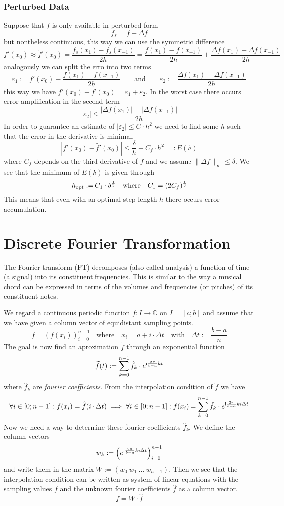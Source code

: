 \subsubsection{Perturbed Data}
Suppose that \(f\) is only available in perturbed form
\[f_s = f + \Delta f\]
but nontheless continuous, this way we can use the symmetric difference
\[f'(x_0) \approx \widetilde{f'}(x_0) = \frac{f_s(x_1) - f_s(x_{-1})}{2h} = \frac{f(x_1) - f(x_{-1})}{2h} + \frac{\Delta f(x_1) - \Delta f(x_{-1})}{2h}\]
analogously we can split the erro into two terms
\[\varepsilon_1 := f'(x_0) - \frac{f(x_1) - f(x_{-1})}{2h} \qquad\text{and}\qquad \varepsilon_2 := \frac{\Delta f(x_1) - \Delta f(x_{-1})}{2h}\]
this way we have \(f'(x_0) - \widetilde{f'}(x_0) = \varepsilon_1 + \varepsilon_2\).
In the worst case there occurs error amplification in the second term
\[|\varepsilon_2| \leq \frac{|\Delta f(x_1)| + |\Delta f(x_{-1})|}{2h}\]
In order to guarantee an estimate of \(|\varepsilon_2| \leq C \cdot h^2\) we need to find some \(h\) such that the error in the derivative is minimal.
\[|f'(x_0) - \widetilde{f'}(x_0) | \leq \frac{\delta}{h} + C_f \cdot h^2 =: E(h)\]
where \(C_f\) depends on the third derivative of \(f\) and we assume \(\|\Delta f\|_\infty \leq \delta\).
We see that the minimum of \(E(h)\) is given through
\[h_{\operatorname{opt}} := C_1 \cdot \delta^\frac{1}{3} \quad\text{where}\quad C_1 = (2 C_f)^\frac{1}{3}\]
This means that even with an optimal step-length \(h\) there occurs error accumulation.

\section{Discrete Fourier Transformation}
The Fourier transform (FT) decomposes (also called analysis) a function of time (a signal) into its constituent frequencies.
This is similar to the way a musical chord can be expressed in terms of the volumes and frequencies (or pitches) of its constituent notes.

 We regard a continuous periodic function \(f: I \to \mathbb{C}\) on \(I = [a; b]\) and assume that we have given a column vector of equidistant sampling points.
\[f = (f(x_i))_{i=0}^{n-1} \quad\text{where}\quad x_i = a + i \cdot \Delta t \quad\text{with}\quad \Delta t := \frac{b-a}{n}\]
The goal is now find an aproximation \(\widetilde{f}\) through an exponential function
 \[\widetilde{f}(t) := \sum_{k=0}^{n-1} \hat{f}_k \cdot e^{\mathrm{i} \frac{2\pi}{b-a} k t}\]
where \(\hat{f}_k\) are \emph{fourier coefficients}.
From the interpolation condition of \(\widetilde{f}\) we have
\[\forall i \in [0; n-1]: f(x_i) = \widetilde{f}(i \cdot \Delta t) \implies \forall i \in [0; n-1]: f(x_i) = \sum_{k=0}^{n-1} \hat{f}_k \cdot e^{\mathrm{i} \frac{2\pi}{b-a} k i \Delta t}\]
Now we need a way to determine these fourier coefficients \(\hat{f}_k\).
We define the column vectors
\[w_k := \left(e^{\mathrm{i} \frac{2\pi}{b-a} k i \Delta t}\right)_{i=0}^{n-1}\]
and write them in the matrix \(W := (w_0~w_1~\ldots~w_{n-1})\).
Then we see that the interpolation condition can be written as system of linear equations with the sampling values \(f\) and the unknown fourier coefficients \(\hat{f}\) as a column vector.
 \[f = W \cdot \hat{f}\]


